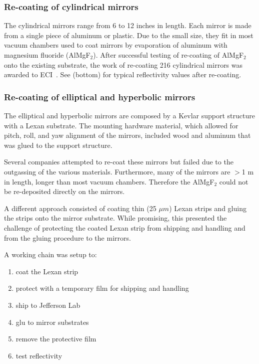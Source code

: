 \subsubsection{Re-coating of cylindrical mirrors}

The cylindrical mirrors range from 6 to 12 inches in length. Each mirror is made from a single piece of aluminum or plastic.
Due to the small size, they fit in most vacuum chambers used to coat mirrors by evaporation of aluminum with magnesium fluoride
(AlMgF$_2$). After successful testing of re-coating of AlMgF$_2$ onto the existing substrate, the work of re-coating 216 cylindrical mirrors
was awarded to ECI~\cite{ECI}. See  (bottom) for typical reflectivity values after re-coating.

\subsubsection{Re-coating of elliptical and hyperbolic mirrors}

The elliptical and hyperbolic mirrors are composed by a Kevlar support structure with a Lexan substrate. The mounting hardware
material, which allowed for pitch, roll, and yaw alignment of the mirrors, included wood and aluminum that was glued to the support structure.

Several companies attempted to re-coat these mirrors but failed due to the outgassing of the various materials. Furthermore, many of the mirrors
are $>$1 m in length, longer than most vacuum chambers. Therefore the AlMgF$_2$ could not be re-deposited directly on the mirrors.

A different approach consisted of coating thin (25 $\mu m$) Lexan strips and gluing the strips onto the mirror substrate. While promising, this
presented the challenge of protecting the coated Lexan strip from shipping and handling and from the gluing procedure to the mirrors.

A working chain was setup to:

\begin{enumerate}
	\item coat the Lexan strip
	\item protect with a temporary film for shipping and handling
	\item ship to Jefferson Lab
	\item glu to mirror substrates
	\item remove the protective film
	\item test reflectivity
\end{enumerate}

